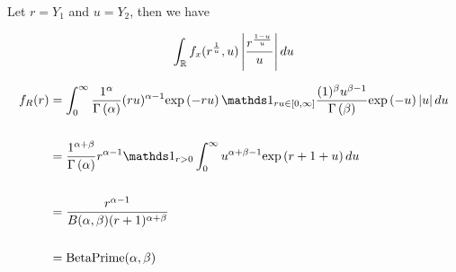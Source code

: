 \documentclass[12pt]{article}
\begin{document}
\begin{enumerate}
Let $r = Y_1$ and $u = Y _2$, then we have

\begin{align*}
    \int_{\mathbb{R}} f_x(r^{\frac{1}{u}}, u) \left|\frac{r^{\frac{1-u}{u}}}{u}\right| du
\end{align*} 





\begin{align*}
    f_R(r) &= \int_0^\infty \frac{1^\alpha}{\Gammaf{\alpha}} (ru)^{\alpha-1} \exp{-ru} \indic{ru \in [0, \infty]} \frac{(1)^\beta u^{\beta-1}}{\Gammaf{\beta}}\exp{-u} \abss{u} du \\ \\
    &= \frac{1^{\alpha + \beta}}{\Gammaf{\alpha}} r^{\alpha-1}  \indic{r > 0} \int_0^\infty u^{\alpha + \beta - 1} \exp{r+1+u} du  \\ \\ 
    &= \frac{r^{\alpha - 1}}{B(\alpha, \beta) (r+1)^{\alpha + \beta}} \\ \\ 
    &= \text{BetaPrime}(\alpha, \beta)
\end{align*}

\end{enumerate}
\end{document}
